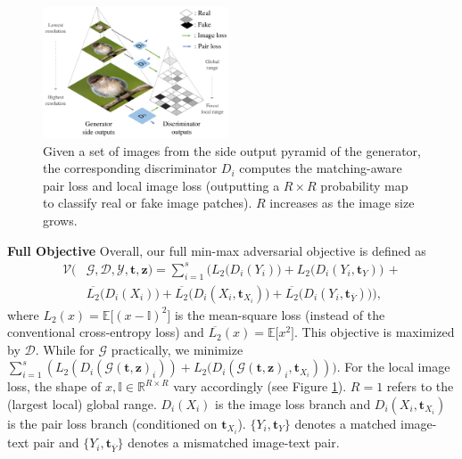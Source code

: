 \documentclass[10pt,twocolumn,letterpaper]{article}
\begin{document}
\begin{figure}[t]
	\centering
	\includegraphics[width=0.49\textwidth]{figure/loss.pdf}
	\vspace{-.7cm}
	\caption{Given a set of images from the side output pyramid of the generator, the corresponding discriminator $D_i$ computes the matching-aware pair loss and local image loss (outputting a $R{\times}R$ probability map to classify real or fake image patches). $R$ increases as the image size grows. }  \vspace{-.2cm}
	\label{fig:loss}
\end{figure}


\textbf{Full Objective } Overall, our full min-max adversarial objective is defined as 
\vspace{-.2cm}
\begin{equation}
\begin{split}
\mathcal{V}(& \mathcal{G},\mathcal{D}, \mathcal{Y}, \bm t, \bm z) = \sum_{i=1}^{s} \Big(  L_2\big(D_i({Y}_i)\big) +  L_2\big(D_i({Y}_i, \bm t_{Y})\big) \, + \\ 
& \overline{L_2}\big(D_i({X}_i)\big)  + \overline{L_2}\big(D_i({X}_i, \bm{t}_{X_i})\big) + \overline{L_2}\big(D_i({Y}_i,  \bm{t}_{\overline{Y}})\big) \Big),
\end{split}
\end{equation}
where $L_2(x) = \mathbb{E}\big[(x - \mathbb{I})^2\big]$ is the mean-square loss (instead of the conventional cross-entropy loss) and $\overline{L_2}(x) =\mathbb{E}\big[x^2\big]$. 
This objective is maximized by $\mathcal{D}$. While for $\mathcal{G}$ practically, we minimize 
$\sum_{i=1}^{s} (L_2(D_i(\mathcal{G}(\bm t, \bm z)_i)) +  L_2\big(D_i(\mathcal{G}(\bm t, \bm z)_i, \bm{t}_{X_i})))$.
For the local image loss, the shape of $x, \mathbb{I} \in \mathbb{R}^{R{\times}R}$ vary accordingly (see Figure \ref{fig:loss}). $R=1$ refers to the (largest local) global range. $D_i(X_i)$ is the image loss branch and $D_i(X_i, \bm{t}_{X_i})$ is the pair loss branch (conditioned on $\bm{t}_{X_i}$).
$\{Y_i, \bm t_{Y}\}$ denotes a matched image-text pair and $\{Y_i, \bm{t}_{\overline{Y}}\}$ denotes a mismatched image-text pair. 
\end{document}
